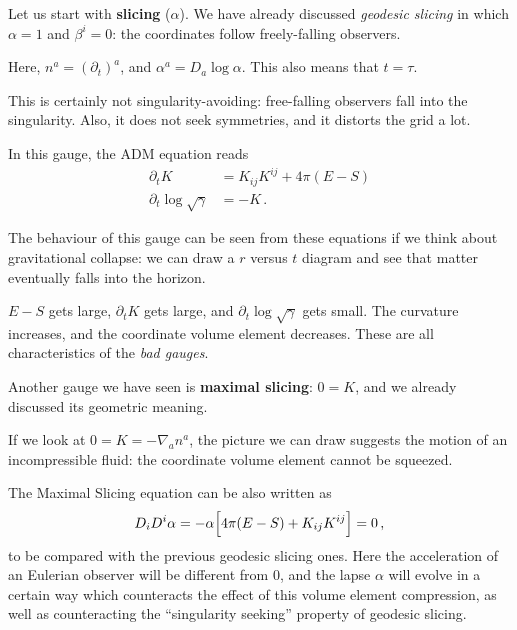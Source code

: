 \documentclass[main.tex]{subfiles}
\begin{document}
Let us start with \textbf{slicing} (\(\alpha \)). 
We have already discussed \emph{geodesic slicing} in which \(\alpha = 1\) and \(\beta^{i} = 0\): the coordinates follow freely-falling observers. 

Here, \(n^a = (\partial_{t})^{a}\), and \(\alpha^{a} = D_a \log \alpha \). This also means that \(t = \tau \). 

This is certainly not singularity-avoiding: free-falling observers fall into the singularity. Also, it does not seek symmetries, and it distorts the grid a lot. 

In this gauge, the ADM equation reads 
%
\begin{align}
\partial_{t} K &= K_{ij} K^{ij} + 4 \pi (E - S)  \\
\partial_{t} \log \sqrt{ \gamma } &= - K
\,.
\end{align}

The behaviour of this gauge can be seen from these equations if we think about gravitational collapse: 
we can draw a \(r\) versus \(t\) diagram and see that matter eventually falls into the horizon. 

\(E-S\) gets large, \(\partial_{t} K\) gets large, and \(\partial_{t} \log \sqrt{\gamma }\) gets small. The curvature increases, and the coordinate volume element decreases. These are all characteristics of the \emph{bad gauges}. 

Another gauge we have seen is \textbf{maximal slicing}: \(0 = K\), and we already discussed its geometric meaning.

If we look at \(0 = K = - \nabla_a n^a\), the picture we can draw suggests the motion of an incompressible fluid: the coordinate volume element cannot be squeezed. 

The Maximal Slicing equation can be also written as 
%
\begin{align}
D_i D^{i} \alpha = - \alpha \qty[ 4 \pi (E-S) + K_{ij} K^{ij} ] = 0
\,,
\end{align}
%
to be compared with the previous geodesic slicing ones.
Here the acceleration of an Eulerian observer will be different from 0, and the lapse \(\alpha \) will evolve in a certain way which counteracts the effect of this volume element compression, as well as counteracting the ``singularity seeking'' property of geodesic slicing. 
 
\end{document}
